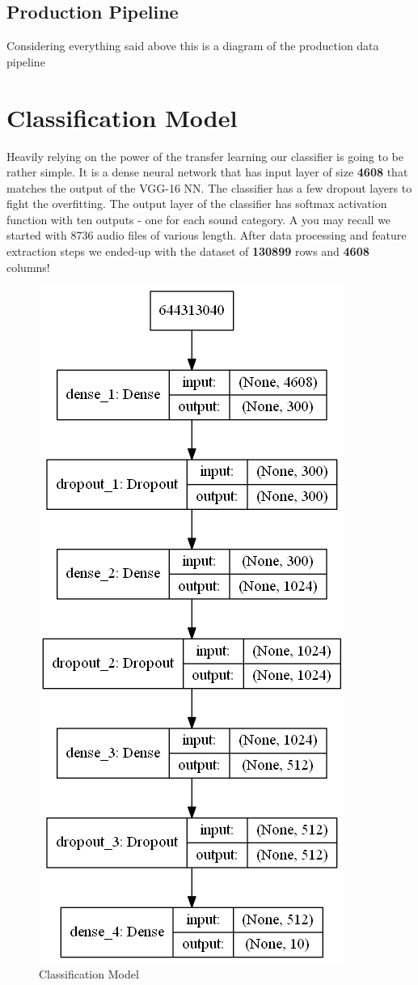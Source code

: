 \hypertarget{production-pipeline}{%
\subsection{Production Pipeline}\label{production-pipeline}}

Considering everything said above this is a diagram of the production
data pipeline

\hypertarget{classification-model}{%
\section{Classification Model}\label{classification-model}}

Heavily relying on the power of the transfer learning our classifier is
going to be rather simple. It is a dense neural network that has input
layer of size \textbf{4608} that matches the output of the VGG-16 NN.
The classifier has a few dropout layers to fight the overfitting. The
output layer of the classifier has softmax activation function with ten
outputs - one for each sound category. A you may recall we started with
8736 audio files of various length. After data processing and feature
extraction steps we ended-up with the dataset of \textbf{130899} rows
and \textbf{4608} columns!

\begin{Schunk}
\begin{figure}[H]

{\centering \includegraphics[width=0.3\linewidth]{../images/classifier_model} 

}

\caption[Classification Model]{Classification Model}\label{fig:classifier}
\end{figure}
\end{Schunk}

